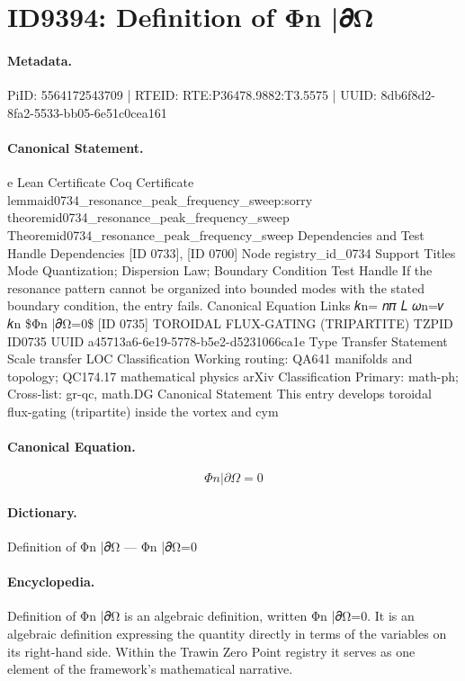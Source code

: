 \section*{ID9394: Definition of Φn |𝜕Ω}
\paragraph{Metadata.}
PiID: 5564172543709 | RTEID: RTE:P36478.9882:T3.5575 | UUID: 8db6f8d2-8fa2-5533-bb05-6e51c0cea161

\paragraph{Canonical Statement.}
e Lean Certificate Coq Certificate lemmaid0734\_resonance\_peak\_frequency\_sweep:sorry theoremid0734\_resonance\_peak\_frequency\_sweep Theoremid0734\_resonance\_peak\_frequency\_sweep Dependencies and Test Handle Dependencies [ID 0733], [ID 0700] Node registry\_id\_0734 Support Titles Mode Quantization; Dispersion Law; Boundary Condition Test Handle If the resonance pattern cannot be organized into bounded modes with the stated boundary condition, the entry fails. Canonical Equation Links 𝑘n= 𝑛𝜋 𝐿 𝜔n=𝑣 𝑘n \$Φn |𝜕Ω=0\$ [ID 0735] TOROIDAL FLUX-GATING (TRIPARTITE) TZPID ID0735 UUID a45713a6-6e19-5778-b5e2-d5231066ca1e Type Transfer Statement Scale transfer LOC Classification Working routing: QA641 manifolds and topology; QC174.17 mathematical physics arXiv Classification Primary: math-ph; Cross-list: gr-qc, math.DG Canonical Statement This entry develops toroidal flux-gating (tripartite) inside the vortex and cym

\paragraph{Canonical Equation.}
\[
Φn |𝜕Ω=0
\]

\paragraph{Dictionary.}
Definition of Φn |𝜕Ω — Φn |𝜕Ω=0

\paragraph{Encyclopedia.}
Definition of Φn |𝜕Ω is an algebraic definition, written Φn |𝜕Ω=0. It is an algebraic definition expressing the quantity directly in terms of the variables on its right-hand side. Within the Trawin Zero Point registry it serves as one element of the framework's mathematical narrative.
